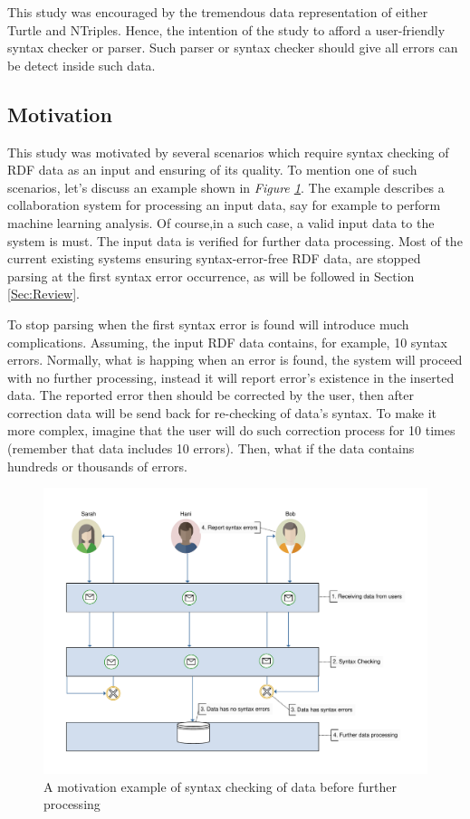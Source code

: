This study was encouraged by the tremendous data representation of either Turtle and NTriples. Hence, the intention of the study to afford a user-friendly syntax checker or parser. Such parser or syntax checker should give all errors can be detect inside such data.


\subsection{Motivation}

This study was motivated by several scenarios which require syntax checking of RDF data as an input and ensuring of its quality. To mention one of such scenarios, let's discuss an example shown in {\it Figure \ref{Fig:Motivation}}. The example describes a collaboration system for processing an input data, say for example to perform machine learning analysis. Of course,in a such case, a valid input data to the system is must. The input data is verified for further data processing. Most of the current existing systems  ensuring syntax-error-free RDF data, are stopped parsing at the first syntax error occurrence, as will be followed in Section \ref{Sec:Review}.
	\par
	To stop parsing when the first syntax error is found will introduce much complications. Assuming, the input RDF data contains, for example, 10 syntax errors. Normally, what is happing when an error is found, the system will proceed with no further processing, instead it will report error's existence in the inserted data. The reported error then should be corrected by the user, then after correction data will be send back for re-checking of data's syntax. To make it more complex, imagine that the user will do such correction process for 10 times (remember that data includes 10 errors). Then, what if the data contains hundreds or thousands of errors. 

	\begin{figure}[ht]
		\begin{center}
			\includegraphics[scale=0.5,angle=0]{images/motivation}
			\caption{A motivation example of syntax checking of data before further processing}
			\label{Fig:Motivation}
		\end{center}
	\end{figure}

